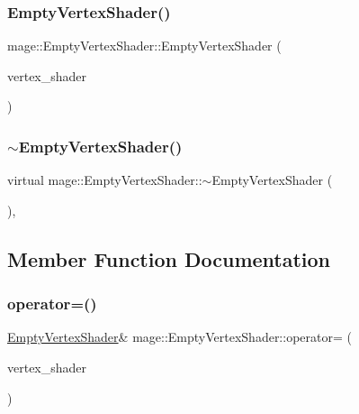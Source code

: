 \subsubsection{\texorpdfstring{Empty\+Vertex\+Shader()}{EmptyVertexShader()}\hspace{0.1cm}{\footnotesize\ttfamily [3/3]}}
{\footnotesize\ttfamily mage\+::\+Empty\+Vertex\+Shader\+::\+Empty\+Vertex\+Shader (\begin{DoxyParamCaption}\item[{\hyperlink{classmage_1_1_empty_vertex_shader}{Empty\+Vertex\+Shader} \&\&}]{vertex\+\_\+shader }\end{DoxyParamCaption})\hspace{0.3cm}{\ttfamily [default]}}

\hypertarget{classmage_1_1_empty_vertex_shader_a321ef00a2087030b81713e989ab02306}{}\label{classmage_1_1_empty_vertex_shader_a321ef00a2087030b81713e989ab02306} 
\subsubsection{\texorpdfstring{$\sim$\+Empty\+Vertex\+Shader()}{~EmptyVertexShader()}}
{\footnotesize\ttfamily virtual mage\+::\+Empty\+Vertex\+Shader\+::$\sim$\+Empty\+Vertex\+Shader (\begin{DoxyParamCaption}{ }\end{DoxyParamCaption})\hspace{0.3cm}{\ttfamily [virtual]}, {\ttfamily [default]}}



\subsection{Member Function Documentation}
\hypertarget{classmage_1_1_empty_vertex_shader_a2683d29127405d51737008637ebde098}{}\label{classmage_1_1_empty_vertex_shader_a2683d29127405d51737008637ebde098} 
\subsubsection{\texorpdfstring{operator=()}{operator=()}\hspace{0.1cm}{\footnotesize\ttfamily [1/2]}}
{\footnotesize\ttfamily \hyperlink{classmage_1_1_empty_vertex_shader}{Empty\+Vertex\+Shader}\& mage\+::\+Empty\+Vertex\+Shader\+::operator= (\begin{DoxyParamCaption}\item[{const \hyperlink{classmage_1_1_empty_vertex_shader}{Empty\+Vertex\+Shader} \&}]{vertex\+\_\+shader }\end{DoxyParamCaption})\hspace{0.3cm}{\ttfamily [delete]}}

